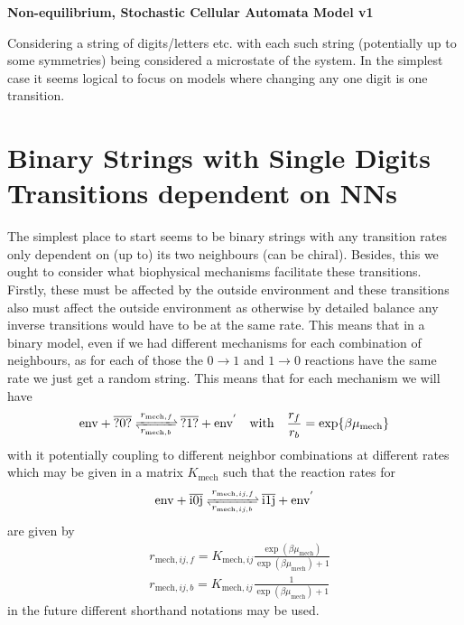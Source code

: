 \documentclass[11pt]{article}
\begin{document}
\begin{center}
	\LARGE
	\textbf{Non-equilibrium, Stochastic Cellular Automata Model v1}
	\vspace{1em}
\end{center}
Considering a string of digits/letters etc. with each such string (potentially up to some symmetries) being considered a microstate of the system.
In the simplest case it seems logical to focus on models where changing any one digit is one transition.

\section{Binary Strings with Single Digits Transitions dependent on NNs}
The simplest place to start seems to be binary strings with any transition rates only dependent on (up to) its two neighbours (can be chiral).
Besides, this we ought to consider what biophysical mechanisms facilitate these transitions.
Firstly, these must be affected by the outside environment and these transitions also must affect the outside environment as otherwise by detailed balance any inverse transitions would have to be at the same rate.
This means that in a binary model, even if we had different mechanisms for each combination of neighbours, as for each of those the $0\rightarrow1$ and $1\rightarrow0$ reactions have the same rate we just get a random string.
This means that for each mechanism we will have
\begin{equation}
	\ce{\text{env} + \overline{?0?} <=>[$r_{\text{mech},f}$][$r_{\text{mech},b}$] \overline{?1?} + \text{env}^'} \qq{with} \frac{r_f}{r_b} = \exp{\beta \mu_\text{mech}}
\end{equation}
with it potentially coupling to different neighbor combinations at different rates which may be given in a matrix $K_\text{mech}$ such that the reaction rates for
\begin{equation}
	\ce{\text{env} + \overline{i0j} <=>[$r_{\text{mech},ij,f}$][$r_{\text{mech},ij,b}$] \overline{i1j} + \text{env}^'}
\end{equation}
are given by
\begin{align}
	 & r_{\text{mech},ij,f} = K_{\text{mech},ij} \frac{\exp(\beta\mu_\text{mech})}{\exp(\beta\mu_\text{mech})+1} \label{eq:rfmech} \\
	 & r_{\text{mech},ij,b} = K_{\text{mech},ij} \frac{1}{\exp(\beta\mu_\text{mech})+1} \label{eq:rbmech}
\end{align}
in the future different shorthand notations may be used.
\end{document}

